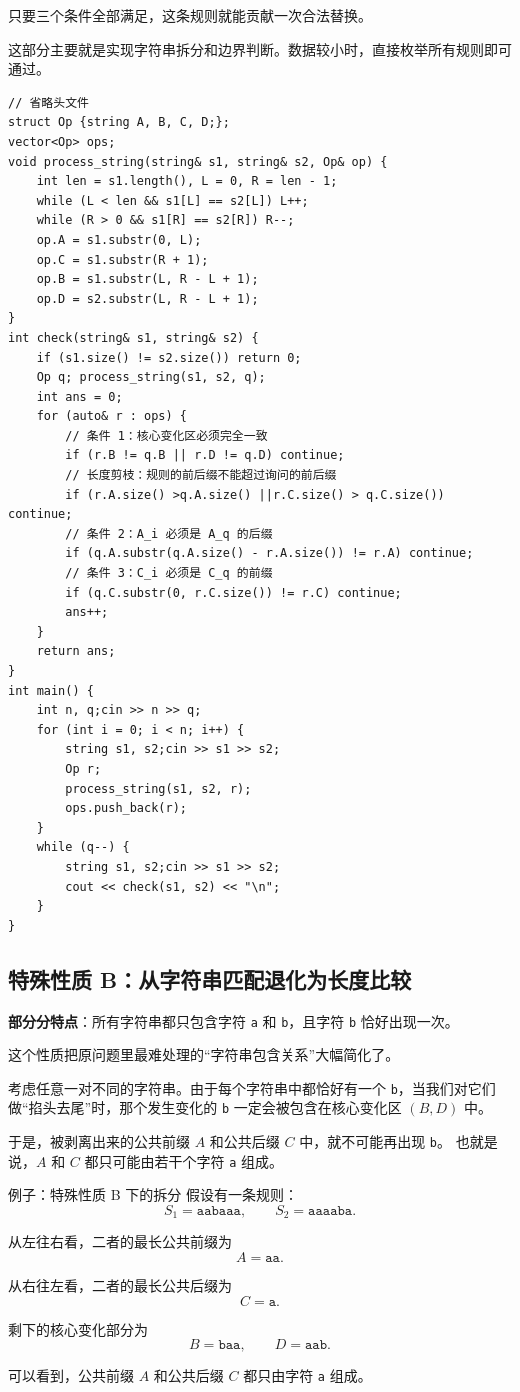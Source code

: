 \documentclass{book}
\newcommand{\code}[1]{\colorbox{codebg}{\texttt{#1}}}  %
\begin{document}
只要三个条件全部满足，这条规则就能贡献一次合法替换。

这部分主要就是实现字符串拆分和边界判断。数据较小时，直接枚举所有规则即可通过。
\newpage
\begin{lstlisting}[style = code]
// 省略头文件
struct Op {string A, B, C, D;};
vector<Op> ops;
void process_string(string& s1, string& s2, Op& op) {
    int len = s1.length(), L = 0, R = len - 1;
    while (L < len && s1[L] == s2[L]) L++;
    while (R > 0 && s1[R] == s2[R]) R--;
    op.A = s1.substr(0, L);
    op.C = s1.substr(R + 1);
    op.B = s1.substr(L, R - L + 1);
    op.D = s2.substr(L, R - L + 1);
}
int check(string& s1, string& s2) {
    if (s1.size() != s2.size()) return 0;
    Op q; process_string(s1, s2, q);
    int ans = 0;
    for (auto& r : ops) {
        // 条件 1：核心变化区必须完全一致
        if (r.B != q.B || r.D != q.D) continue;
        // 长度剪枝：规则的前后缀不能超过询问的前后缀
        if (r.A.size() >q.A.size() ||r.C.size() > q.C.size()) continue;
        // 条件 2：A_i 必须是 A_q 的后缀
        if (q.A.substr(q.A.size() - r.A.size()) != r.A) continue;
        // 条件 3：C_i 必须是 C_q 的前缀
        if (q.C.substr(0, r.C.size()) != r.C) continue;
        ans++;
    }
    return ans;
}
int main() {
    int n, q;cin >> n >> q;
    for (int i = 0; i < n; i++) {
        string s1, s2;cin >> s1 >> s2;
        Op r;
        process_string(s1, s2, r);
        ops.push_back(r);
    }
    while (q--) {
        string s1, s2;cin >> s1 >> s2;
        cout << check(s1, s2) << "\n";
    }
}
\end{lstlisting}

\subsection{特殊性质 B：从字符串匹配退化为长度比较}

\textbf{部分分特点}：所有字符串都只包含字符 \code{a} 和 \code{b}，且字符 \code{b} 恰好出现一次。

这个性质把原问题里最难处理的“字符串包含关系”大幅简化了。

考虑任意一对不同的字符串。由于每个字符串中都恰好有一个 \code{b}，当我们对它们做“掐头去尾”时，那个发生变化的 \code{b} 一定会被包含在核心变化区 $(B,D)$ 中。

于是，被剥离出来的公共前缀 $A$ 和公共后缀 $C$ 中，就不可能再出现 \code{b}。  
也就是说，$A$ 和 $C$ 都只可能由若干个字符 \code{a} 组成。

\begin{examplebox}{例子：特殊性质 B 下的拆分}
假设有一条规则：
\[
S_1=\texttt{aabaaa},\qquad S_2=\texttt{aaaaba}.
\]

从左往右看，二者的最长公共前缀为
\[
A=\texttt{aa}.
\]

从右往左看，二者的最长公共后缀为
\[
C=\texttt{a}.
\]

剩下的核心变化部分为
\[
B=\texttt{baa},\qquad D=\texttt{aab}.
\]

可以看到，公共前缀 $A$ 和公共后缀 $C$ 都只由字符 \code{a} 组成。
\end{examplebox}
\end{document}
